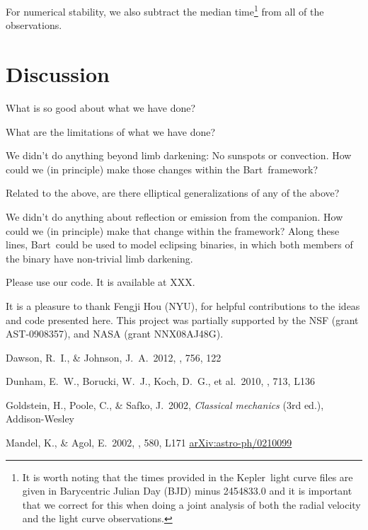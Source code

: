 \documentclass[12pt,preprint]{aastex}
\newcommand{\project}[1]{{\sffamily #1}}
\newcommand{\bart}{\project{Bart}}
\newcommand{\kepler}{\project{Kepler}}
\begin{document}
For numerical stability, we also subtract the median time\footnote{It is worth
noting that the times provided in the \kepler\ light curve files are given in
Barycentric Julian Day (BJD) minus 2454833.0 and it is important that we
correct for this when doing a joint analysis of both the radial velocity and
the light curve observations.} from all of the observations.


\section{Discussion}

What is so good about what we have done?

What are the limitations of what we have done?

We didn't do anything beyond limb darkening:  No sunspots or convection.
How could we (in principle) make those changes within the \bart\ framework?

Related to the above, are there elliptical generalizations of any of the above?

We didn't do anything about reflection or emission from the companion.
How could we (in principle) make that change within the framework?
Along these lines, \bart\ could be used to model eclipsing binaries,
in which both members of the binary have non-trivial limb darkening.

Please use our code.  It is available at XXX.

\acknowledgments It is a pleasure to thank
Fengji Hou (NYU),
for helpful contributions to the ideas and code presented here.
This project was partially supported by the NSF (grant AST-0908357), and NASA
(grant NNX08AJ48G).


\newcommand{\arxiv}[1]{\href{http://arxiv.org/abs/#1}{arXiv:#1}}
\begin{thebibliography}{}\raggedright

Dawson, R.~I., \& Johnson, J.~A.\ 2012, \apj, 756, 122

Dunham, E.~W., Borucki, W.~J., Koch, D.~G., et al.\ 2010, \apjl, 713, L136

Goldstein, H., Poole, C., \& Safko, J.\ 2002, \emph{Classical mechanics}
    (3rd ed.), Addison-Wesley

Mandel, K., \& Agol, E.\ 2002, \apjl, 580, L171 \arxiv{astro-ph/0210099}

\end{thebibliography}
\end{document}
